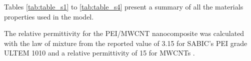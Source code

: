 \documentclass[review,times,sagev,doublespace]{sagej}
\begin{document}
\begin{sm}

Tables \ref{tab:table_s1} to \ref{tab:table_s4} present a summary of all the materials properties used in the model. 

The relative permittivity for the PEI/MWCNT nanocomposite was calculated with the law of mixture from the reported value of 3.15 for SABIC’s PEI grade ULTEM 1010 and a relative permittivity of 15 for MWCNTs \cite{Katsounaros2011}. 

\begin{table}[ht]
	\centering
	\caption{List of all specific heat used in the model}
	\label{tab:table_s1}
\end{table}


\end{sm}
\end{document}

